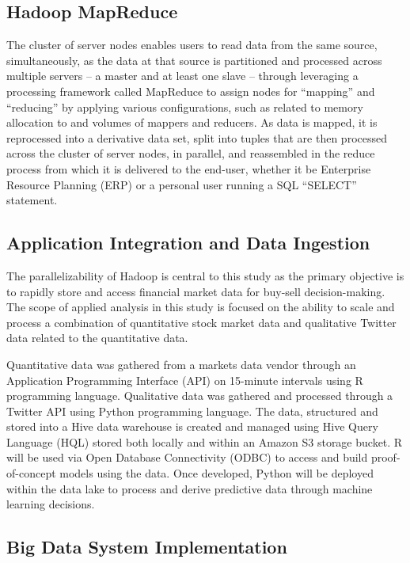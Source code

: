 \documentclass[journal]{IEEEtran}
\begin{document}
\subsection{Hadoop MapReduce}

The cluster of server nodes enables users to read data from the same source,
 simultaneously, as the data at that source is partitioned and
 processed across multiple servers – a master and at least one slave 
 – through leveraging a processing framework called MapReduce to assign
 nodes for ``mapping'' and ``reducing'' by applying various configurations,
 such as related to memory allocation to and volumes of mappers and reducers. 
As data is mapped, it is reprocessed into a derivative data set,
 split into tuples that are then processed across the cluster
 of server nodes, in parallel, and reassembled in the reduce process
 from which it is delivered to the end-user, whether it be Enterprise
 Resource Planning (ERP) or a personal user running a SQL “SELECT” statement.

\subsection{Application Integration and Data Ingestion}

The parallelizability of Hadoop is central to this study as the primary
 objective is to rapidly store and access financial market data for 
 buy-sell decision-making. 
The scope of applied analysis in this study is focused on the ability to
 scale and process a combination of quantitative stock market data and
 qualitative Twitter data related to the quantitative data. 

Quantitative data was gathered from a markets data vendor through an
 Application Programming Interface (API) on 15-minute intervals using R
 programming language. 
Qualitative data was gathered and processed through a Twitter API
 using Python programming language. 
The data, structured and stored into a Hive data warehouse is created and
 managed using Hive Query Language (HQL) stored both locally and
 within an Amazon S3 storage bucket. 
R will be used via Open Database Connectivity (ODBC) to access and
 build proof-of-concept models using the data. Once developed,
 Python will be deployed within the data lake to process and
 derive predictive data through machine learning decisions.

\subsection{Big Data System Implementation}
\end{document}
